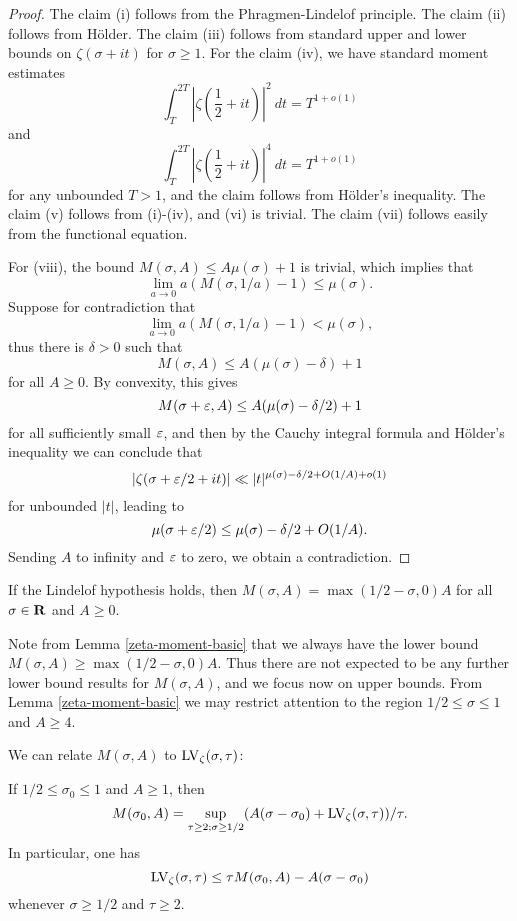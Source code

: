 \begin{proof} The claim (i) follows from the Phragmen-Lindelof principle.  The claim (ii) follows from H\"older.  The claim (iii) follows from standard upper and lower bounds on $\zeta(\sigma+it)$ for $\sigma \geq 1$.  For the claim (iv), we have standard moment estimates
$$ \int_T^{2T} |\zeta(\frac{1}{2}+it)|^2\ dt = T^{1+o(1)}$$
and
$$ \int_T^{2T} |\zeta(\frac{1}{2}+it)|^4\ dt = T^{1+o(1)}$$
for any unbounded $T>1$, and the claim follows from H\"older's inequality.  The claim (v) follows from (i)-(iv), and (vi) is trivial. The claim (vii) follows easily from the functional equation.

For (viii), the bound $M(\sigma,A) \leq A \mu(\sigma) + 1$ is trivial, which implies that
$$ \lim_{a \to 0} a(M(\sigma,1/a)-1) \leq \mu(\sigma).$$
Suppose for contradiction that
$$ \lim_{a \to 0} a(M(\sigma,1/a)-1) < \mu(\sigma),$$
thus there is $\delta>0$ such that
$$M(\sigma,A) \leq A (\mu(\sigma)-\delta) + 1$$
for all $A\geq 0$.  By convexity, this gives
$$M(\sigma+\varepsilon,A) \leq A (\mu(\sigma)-\delta/2) + 1$$
for all sufficiently small $\varepsilon$, and then by the Cauchy integral formula and H\"older's inequality we can conclude that
$$ |\zeta(\sigma+\varepsilon/2 +it)| \ll |t|^{\mu(\sigma)-\delta/2 + O(1/A) + o(1)} $$
for unbounded $|t|$, leading to
$$ \mu(\sigma+\varepsilon/2) \leq \mu(\sigma)-\delta/2 + O(1/A).$$
Sending $A$ to infinity and $\varepsilon$ to zero, we obtain a contradiction.
\end{proof}

\begin{corollary}\label{moment_from_lindelof} If the Lindelof hypothesis holds, then $M(\sigma,A) = \max(1/2-\sigma,0) A$ for all $\sigma \in \mathbf{R}$ and $A \geq 0$.
\end{corollary}

Note from Lemma \ref{zeta-moment-basic} that we always have the lower bound $M(\sigma,A) \geq \max(1/2-\sigma,0) A$.  Thus there are not expected to be any further lower bound results for $M(\sigma,A)$, and we focus now on upper bounds.  From Lemma \ref{zeta-moment-basic} we may restrict attention to the region $1/2 \leq \sigma \leq 1$ and $A \geq 4$.

We can relate $M(\sigma,A)$ to $\mathrm{LV}_\zeta(\sigma,\tau)$:

\begin{lemma}\label{mad}  If $1/2 \leq \sigma_0 \leq 1$ and $A \geq 1$, then
\begin{equation}\label{M-form}
 M(\sigma_0,A) = \sup_{\tau \geq 2; \sigma \geq 1/2} (A(\sigma-\sigma_0) + \mathrm{LV}_\zeta(\sigma,\tau))/\tau.
\end{equation}
In particular, one has
$$ \mathrm{LV}_\zeta(\sigma,\tau) \leq \tau M(\sigma_0,A) - A(\sigma-\sigma_0)$$
whenever $\sigma \geq 1/2$ and $\tau \geq 2$.
\end{lemma}

